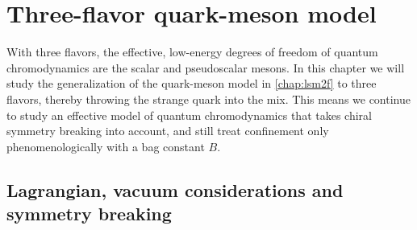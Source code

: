 \chapter{Three-flavor quark-meson model}
\label{chap:lsm3f}





With three flavors, the effective, low-energy degrees of freedom of quantum chromodynamics are the scalar and pseudoscalar mesons. %
In this chapter we will study the generalization of the quark-meson model in \cref{chap:lsm2f} to three flavors,
thereby throwing the strange quark into the mix.
This means we continue to study an effective model of quantum chromodynamics that takes chiral symmetry breaking into account,
and still treat confinement only phenomenologically with a bag constant $B$.

\section{Lagrangian, vacuum considerations and symmetry breaking}


